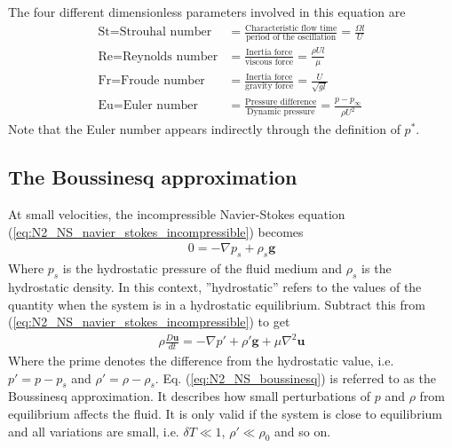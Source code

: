 \documentclass[a4paper, 12pt]{article}
\numberwithin{equation}{subsubsection}
\begin{document}
The four different dimensionless parameters involved in this equation are
\begin{align*}
    \text{St} = \text{Strouhal number} &= \frac{\text{Characteristic flow time}}{\text{period of the oscillation}} = \frac{\Omega l}{U} \\
    \text{Re} = \text{Reynolds number} &= \frac{\text{Inertia force}}{\text{viscous force}} = \frac{\rho U l}{\mu} \\
    \text{Fr} = \text{Froude number} &= \frac{\text{Inertia force}}{\text{gravity force}} = \frac{U}{\sqrt{gl}} \\
    \text{Eu} = \text{Euler number} &= \frac{\text{Pressure difference}}{\text{Dynamic pressure}} = \frac{p - p_\infty}{\rho U^2}
\end{align*}
Note that the Euler number appears indirectly through the definition of $p^*$.

\subsection{The Boussinesq approximation}
At small velocities, the incompressible Navier-Stokes equation (\ref{eq:N2_NS_navier_stokes_incompressible}) becomes 
\begin{align}
	0 = - \nabla p_s + \rho_s \mathbf{g}
\end{align}
Where $p_s$ is the hydrostatic pressure of the fluid medium and $\rho_s$ is the hydrostatic density. In this context, ''hydrostatic'' refers to the values of the quantity when the system is in a hydrostatic equilibrium. Subtract this from (\ref{eq:N2_NS_navier_stokes_incompressible}) to get
\begin{align}
	\rho \frac{D \mathbf{u}}{dt} = - \nabla p' + \rho ' \mathbf{g} + \mu \nabla^2 \mathbf{u} \label{eq:N2_NS_boussinesq}
\end{align}
Where the prime denotes the difference from the hydrostatic value, i.e. $p' = p - p_s$ and $\rho' = \rho - \rho_s$. Eq. (\ref{eq:N2_NS_boussinesq}) is referred to as the Boussinesq approximation. It describes how small perturbations of $p$ and $\rho$ from equilibrium affects the fluid. It is only valid if the system is close to equilibrium and all variations are small, i.e. $\delta T \ll 1$, $\rho' \ll \rho_0$ and so on.

\end{document}
